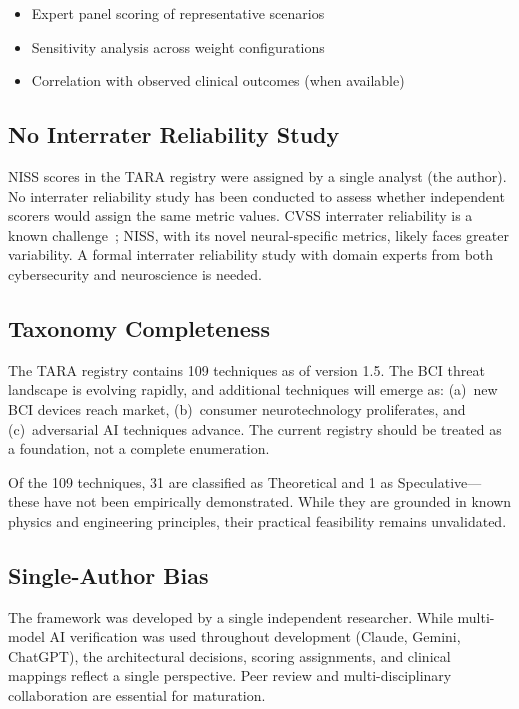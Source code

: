 \begin{itemize}
  \item Expert panel scoring of representative scenarios
  \item Sensitivity analysis across weight configurations
  \item Correlation with observed clinical outcomes (when available)
\end{itemize}

\subsection{No Interrater Reliability Study}

NISS scores in the TARA registry were assigned by a single analyst (the author).
No interrater reliability study has been conducted to assess whether independent
scorers would assign the same metric values. CVSS interrater reliability is a
known challenge~\cite{first2023cvss4}; NISS, with its novel neural-specific
metrics, likely faces greater variability. A formal interrater reliability study
with domain experts from both cybersecurity and neuroscience is needed.

\subsection{Taxonomy Completeness}

The TARA registry contains 109 techniques as of version 1.5. The BCI threat
landscape is evolving rapidly, and additional techniques will emerge as:
(a)~new BCI devices reach market, (b)~consumer neurotechnology proliferates,
and (c)~adversarial AI techniques advance. The current registry should be treated
as a foundation, not a complete enumeration.

Of the 109 techniques, 31 are classified as Theoretical and 1 as Speculative---these
have not been empirically demonstrated. While they are grounded in known physics
and engineering principles, their practical feasibility remains unvalidated.

\subsection{Single-Author Bias}

The framework was developed by a single independent researcher. While
multi-model AI verification was used throughout development (Claude, Gemini,
ChatGPT), the architectural decisions, scoring assignments, and clinical
mappings reflect a single perspective. Peer review and multi-disciplinary
collaboration are essential for maturation.

